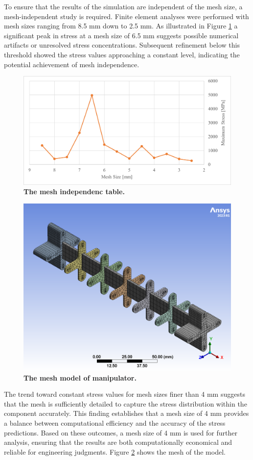 To ensure that the results of the simulation are independent of the mesh size, a mesh-independent study is required. 
Finite element analyses were performed with mesh sizes ranging from 8.5 mm down to 2.5 mm. As illustrated in 
Figure \ref{fig:mesh_indep} a significant peak in stress at a mesh size of 6.5 mm suggests possible numerical artifacts or 
unresolved stress concentrations. Subsequent refinement below this threshold showed the stress values approaching 
a constant level, indicating the potential achievement of mesh independence.
\begin{figure}[H] %
    \centering
    \captionsetup{labelsep=colon}
    \includegraphics[width=.85\textwidth]{Image/Design/mesh_independence.png} 
    \caption[The mesh independence table]
    {\centering \textbf{The mesh independenc table.}}
    \label{fig:mesh_indep}
\end{figure}
\begin{figure}[H] %
    \centering
    \captionsetup{labelsep=colon}
    \includegraphics[width=.85\textwidth]{Image/Design/model_mesh.png} 
    \caption[The mesh model of manipulator]
    {\centering \textbf{The mesh model of manipulator.}}
    \label{fig:mesh_model}
\end{figure}
\noindent The trend toward constant stress values for mesh sizes finer than 4 mm suggests that the mesh is sufficiently 
detailed to capture the stress distribution within the component accurately. This finding establishes that a 
mesh size of 4 mm provides a balance between computational efficiency and the accuracy of the stress predictions. 
Based on these outcomes, a mesh size of 4 mm is used for further analysis, ensuring that the results are both 
computationally economical and reliable for engineering judgments. Figure \ref{fig:mesh_model} shows the mesh 
of the model.
